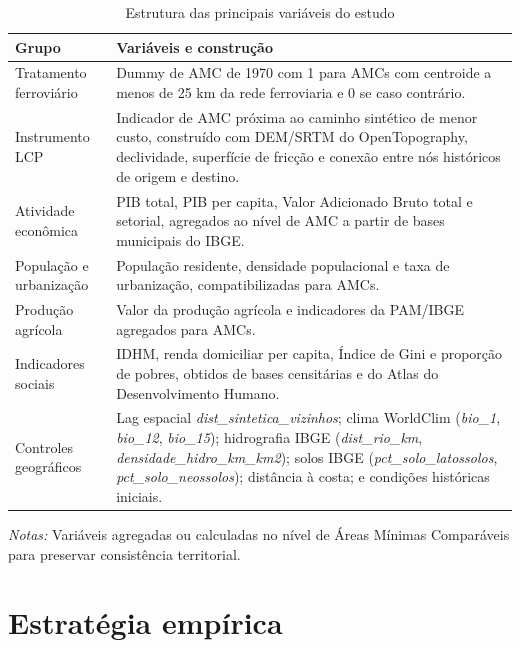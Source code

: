 \documentclass[12pt,a4paper]{article}
\begin{document}
\begin{table}[!htbp]
\centering
\scriptsize
\setlength{\tabcolsep}{3.5pt}
\renewcommand{\arraystretch}{0.80}
\caption{Estrutura das principais variáveis do estudo}
\begin{tabular}{>{\raggedright\arraybackslash}p{3.7cm}>{\raggedright\arraybackslash}p{8.9cm}}
\toprule
\textbf{Grupo} & \textbf{Variáveis e construção} \\
\midrule
Tratamento ferroviário & Dummy de AMC de 1970 com 1 para AMCs com centroide a menos de 25 km da rede ferroviaria e 0 se caso contrário. \\
Instrumento LCP & Indicador de AMC próxima ao caminho sintético de menor custo, construído com DEM/SRTM do OpenTopography, declividade, superfície de fricção e conexão entre nós históricos de origem e destino. \\
Atividade econômica & PIB total, PIB per capita, Valor Adicionado Bruto total e setorial, agregados ao nível de AMC a partir de bases municipais do IBGE. \\
População e urbanização & População residente, densidade populacional e taxa de urbanização, compatibilizadas para AMCs. \\
Produção agrícola & Valor da produção agrícola e indicadores da PAM/IBGE agregados para AMCs. \\
Indicadores sociais & IDHM, renda domiciliar per capita, Índice de Gini e proporção de pobres, obtidos de bases censitárias e do Atlas do Desenvolvimento Humano. \\
Controles geográficos & Lag espacial \textit{dist\_sintetica\_vizinhos}; clima WorldClim (\textit{bio\_1}, \textit{bio\_12}, \textit{bio\_15}); hidrografia IBGE (\textit{dist\_rio\_km}, \textit{densidade\_hidro\_km\_km2}); solos IBGE (\textit{pct\_solo\_latossolos}, \textit{pct\_solo\_neossolos}); distância à costa; e condições históricas iniciais. \\
\bottomrule
\end{tabular}
\label{tab:estrutura_variaveis}
\vspace{0.1cm}

\begin{minipage}{0.95\textwidth}
\scriptsize \textit{Notas:} Variáveis agregadas ou calculadas no nível de Áreas Mínimas Comparáveis para preservar consistência territorial.
\end{minipage}
\end{table}

\section{Estratégia empírica}
\end{document}
